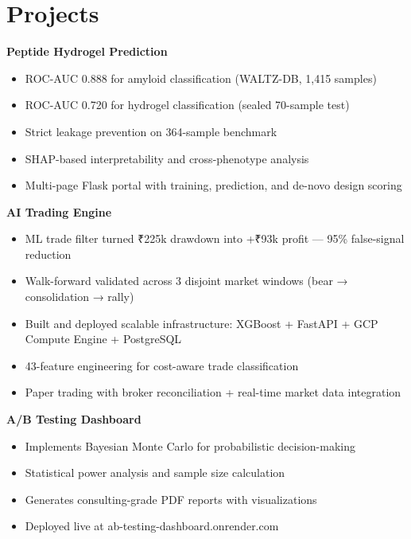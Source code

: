 \documentclass[11pt,a4paper]{article}
\begin{document}
\section*{Projects}
\noindent\textbf{Peptide Hydrogel Prediction} \hfill \href{https://peptide-hydrogel-portal.onrender.com}{\faGlobe} \href{https://github.com/jiyanshusingh/hydrogel_project}{\faGithub}
\begin{itemize}
    \item ROC-AUC 0.888 for amyloid classification (WALTZ-DB, 1,415 samples)
    \item ROC-AUC 0.720 for hydrogel classification (sealed 70-sample test)
    \item Strict leakage prevention on 364-sample benchmark
    \item SHAP-based interpretability and cross-phenotype analysis
    \item Multi-page Flask portal with training, prediction, and de-novo design scoring
\end{itemize}

\noindent\textbf{AI Trading Engine} \hfill \href{https://github.com/jiyanshusingh/trading-engine}{\faGithub}
\begin{itemize}
    \item ML trade filter turned ₹225k drawdown into +₹93k profit — 95\% false-signal reduction
    \item Walk-forward validated across 3 disjoint market windows (bear → consolidation → rally)
    \item Built and deployed scalable infrastructure: XGBoost + FastAPI + GCP Compute Engine + PostgreSQL
    \item 43-feature engineering for cost-aware trade classification
    \item Paper trading with broker reconciliation + real-time market data integration
\end{itemize}

\noindent\textbf{A/B Testing Dashboard} \hfill \href{https://ab-testing-dashboard.onrender.com}{\faGlobe} \href{https://github.com/jiyanshusingh/ab-testing-dashboard}{\faGithub}
\begin{itemize}
    \item Implements Bayesian Monte Carlo for probabilistic decision-making
    \item Statistical power analysis and sample size calculation
    \item Generates consulting-grade PDF reports with visualizations
    \item Deployed live at ab-testing-dashboard.onrender.com
\end{itemize}
\end{document}
